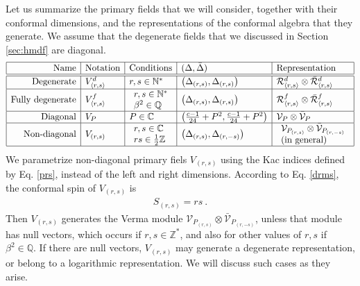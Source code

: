 \documentclass[12pt, a4paper]{article}
\theoremstyle{break}
\begin{document}
Let us summarize the primary fields that we will consider, together with their conformal dimensions, and the representations of the conformal algebra that they generate. We assume that the degenerate fields that we discussed in Section \ref{sec:hmdf} are diagonal. 
\begin{align}
 \begin{array}{|r|l|l|l|l|}
  \hline 
  \text{Name} & \text{Notation} & \text{Conditions} & (\Delta,\bar \Delta) & \text{Representation}
  \\
  \hline \hline 
  \text{Degenerate} &  V^d_{\langle r,s\rangle} &  r,s\in\mathbb{N}^* & \left(\Delta_{(r,s)},\Delta_{(r,s)}\right)  & \mathcal{R}^d_{\langle r,s\rangle}\otimes \bar{\mathcal{R}}^d_{\langle r,s\rangle} 
  \\
  \hline 
  \text{Fully degenerate} & V^f_{\langle r,s\rangle} & \begin{array}{l} r,s\in\mathbb{N}^* \\ \beta^2\in\mathbb{Q} \end{array} & \left(\Delta_{(r,s)},\Delta_{(r,s)}\right)  & \mathcal{R}^f_{\langle r,s\rangle}\otimes \bar{\mathcal{R}}^f_{\langle r,s\rangle} 
  \\
  \hline 
  \text{Diagonal} & V_P & P\in\mathbb{C} & \left(\tfrac{c-1}{24}+P^2,\tfrac{c-1}{24}+P^2\right) & \mathcal{V}_P\otimes \bar{\mathcal{V}}_P 
  \\
  \hline 
  \text{Non-diagonal} & V_{(r,s)} & 
  \begin{array}{l} r,s\in\mathbb{C} \\ 
  rs\in \tfrac12\mathbb{Z} \end{array} & \left(\Delta_{(r,s)},\Delta_{(r,-s)}\right) & 
  \begin{array}{l} \mathcal{V}_{P_{(r,s)}} \otimes \bar{\mathcal{V}}_{P_{(r,-s)}} \\ \text{(in general)} \end{array}
  \\
  \hline 
 \end{array}
 \label{fields}
\end{align}
We parametrize non-diagonal primary fiels $V_{(r,s)}$ using the Kac indices defined by Eq. \eqref{prs}, instead of the left and right dimensions. 
According to Eq. \eqref{drms}, the conformal spin of $V_{(r,s)}$ is 
\begin{align}
 \boxed{S_{(r,s)}= rs} \ . 
 \label{srs}
\end{align}
Then $V_{(r,s)}$ generates the Verma module $\mathcal{V}_{P_{(r,s)}} \otimes \bar{\mathcal{V}}_{P_{(r,-s)}}$, unless that module has null vectors, which occurs if $r,s\in\mathbb{Z}^*$, and also for other values of $r,s$ if $\beta^2\in\mathbb{Q}$. If there are null vectors, $V_{(r,s)}$ may generate a degenerate representation, or belong to a logarithmic representation. We will discuss such cases as they arise.  
\end{document}
